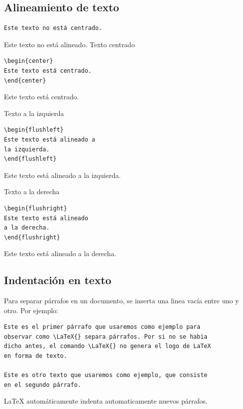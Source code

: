 \documentclass[../notes.tex]{subfiles}
\begin{document}
    \subsection{Alineamiento de texto}
                \begin{verbatim}
Este texto no está centrado.
                \end{verbatim}
Este texto no está alineado.
                Texto centrado
                    \begin{verbatim}
\begin{center}
Este texto está centrado.
\end{center}
                    \end{verbatim}
\begin{center}
Este texto está centrado.
\end{center}
        

                Texto a la izquierda
                    \begin{verbatim}
\begin{flushleft}
Este texto está alineado a
la izquierda.
\end{flushleft}
                    \end{verbatim}
\begin{flushleft}
Este texto está alineado a la izquierda.
\end{flushleft}
                Texto a la derecha
                    \begin{verbatim}
\begin{flushright}
Este texto está alineado
a la derecha.
\end{flushright}
                    \end{verbatim}
\begin{flushright}
Este texto está alineado a la derecha.
\end{flushright}

    \subsection{Indentación en texto}
    
        Para separar párrafos en un documento, se inserta una linea vacía entre uno y otro. Por ejemplo:
        \begin{verbatim}
Este es el primer párrafo que usaremos como ejemplo para 
observar como \LaTeX{} separa párrafos. Por si no se habia
dicho antes, el comando \LaTeX{} no genera el logo de LaTeX
en forma de texto.

Este es otro texto que usaremos como ejemplo, que consiste
en el segundo párrafo.
        \end{verbatim}
        \LaTeX{} automáticamente indenta automaticamente nuevos párrafos. 
    
\end{document}
